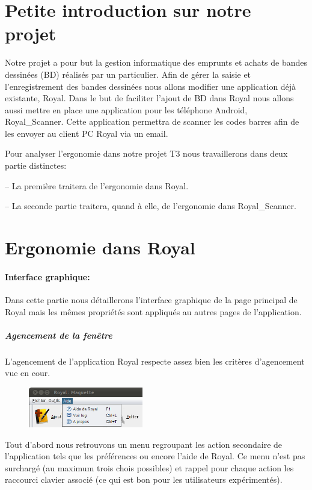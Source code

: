 \documentclass[etudiants]{support-iutrs}
\begin{document}
\header
\section{Petite introduction sur notre projet}

Notre projet a pour but la gestion informatique des emprunts et achats de bandes dessinées (BD) réalisés par un particulier.
Afin de gérer la saisie et l’enregistrement des bandes dessinées nous allons modifier une application déjà existante, Royal. 
Dans le but de faciliter l'ajout de BD dans Royal nous allons aussi mettre en place une application pour les téléphone Android, Royal\_Scanner.
Cette application permettra de scanner les codes barres afin de les envoyer au client PC Royal via un email.

Pour analyser l'ergonomie dans notre projet T3 nous travaillerons dans deux partie distinctes: 

-- La première traitera de l'ergonomie dans Royal.

-- La seconde partie traitera, quand à elle, de l'ergonomie dans Royal\_Scanner.

\section{Ergonomie dans Royal}
\paragraph{Interface graphique:}
Dans cette partie nous détaillerons l'interface graphique de la page principal de Royal mais les mêmes propriétés sont appliqués au autres pages de l'application. 

\subparagraph{Agencement de la fenêtre}
L'agencement de l'application Royal respecte assez bien les critères d'agencement vue en cour.

\begin{figure}
\includegraphics[width=5cm]{img/app_pc_maquette_menu.png}
\end{figure}

Tout d'abord nous retrouvons un menu regroupant les action secondaire de l'application tels que les préférences ou encore l'aide de Royal. 
Ce menu n'est pas surchargé (au maximum trois chois possibles) et rappel pour chaque action les raccourci clavier associé (ce qui est bon pour les utilisateurs expérimentés).
\end{document}

